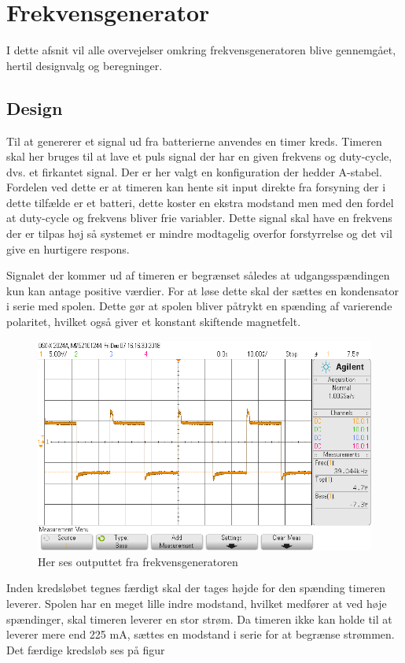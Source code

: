 \section{Frekvensgenerator}\label{sec:frekv_gen}
I dette afsnit vil alle overvejelser omkring frekvensgeneratoren blive gennemgået, hertil designvalg og beregninger. 
\subsection{Design}
Til at genererer et signal ud fra batterierne anvendes en timer kreds. 
Timeren skal her bruges til at lave et puls signal der har en given frekvens og duty-cycle, dvs. et firkantet signal. 
Der er her valgt en konfiguration der hedder A-stabel. 
Fordelen ved dette er at timeren kan hente sit input direkte fra forsyning der i dette tilfælde er et batteri, dette koster en ekstra modstand men med den fordel at duty-cycle og frekvens bliver frie variabler. 
Dette signal skal have en frekvens der er tilpas høj så systemet er mindre modtagelig overfor forstyrrelse og det vil give en hurtigere respons. 

Signalet der kommer ud af timeren er begrænset således at udgangsspændingen kun kan antage positive værdier.
For at løse dette skal der sættes en kondensator i serie med spolen.
Dette gør at spolen bliver påtrykt en spænding af varierende polaritet, hvilket også giver et konstant skiftende magnetfelt.
\begin{figure}[h!]
	\centering
	\includegraphics[width=1\textwidth]{billeder/freq_png.png}
	\caption{Her ses outputtet fra frekvensgeneratoren}
	\label{fig:frekvensgenerator}
\end{figure}
Inden kredsløbet tegnes færdigt skal der tages højde for den spænding timeren leverer. 
Spolen har en meget lille indre modstand, hvilket medfører at ved høje spændinger, skal timeren leverer en stor strøm. 
Da timeren ikke kan holde til at leverer mere end 225 \si{\milli\ampere}, sættes en modstand i serie for at begrænse strømmen. 
Det færdige kredsløb ses på figur 

